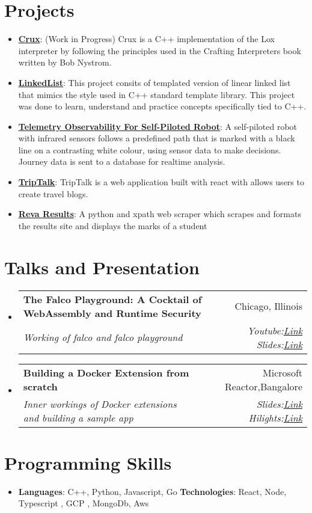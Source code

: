 \documentclass[letterpaper,11pt]{article}
\makeatletter
\newcommand{\resumeItem}[2]{
  \item\small{
    \textbf{#1}{: #2 \vspace{-2pt}}
  }
}
\newcommand{\resumeSubheading}[4]{
  \vspace{-1pt}\item
    \begin{tabular*}{0.97\textwidth}{l@{\extracolsep{\fill}}r}
      \textbf{#1} & #2 \\
      \textit{\small#3} & \textit{\small #4} \\
    \end{tabular*}\vspace{-5pt}
}
\newcommand{\resumeSubItem}[2]{\resumeItem{#1}{#2}\vspace{-4pt}}
\newcommand{\resumeSubHeadingListStart}{\begin{itemize}[leftmargin=*]}
\newcommand{\resumeSubHeadingListEnd}{\end{itemize}}
\makeatother
\begin{document}
\section{Projects}
  \resumeSubHeadingListStart
    \resumeSubItem{\href{https://github.com/Rohith-Raju/Crux}{Crux}}{(Work in Progress) Crux is a C++ implementation of the Lox interpreter by following the principles used in the Crafting Interpreters book written by Bob Nystrom.
    }
    \resumeSubItem{\href{https://github.com/Rohith-Raju/LinkedList}{LinkedList}}{This project consits of templated version of linear linked list that mimics the style used in C++ standard template library. This project was done to learn, 
    understand and practice concepts specifically tied to C++.}
    \resumeSubItem{\href{https://www.jetir.org/view?paper=JETIR2306084}{Telemetry Observability For Self-Piloted Robot}}
    {A self-piloted robot with infrared sensors follows a  predefined path that is marked with a 
    black line on a contrasting white colour, using sensor data to make decisions. Journey data is sent to a database for
    realtime analysis.}
    \resumeSubItem{\href{https://triptalk-production.web.app/home}{TripTalk}}
    {TripTalk is a  web application built with react with allows users to create travel blogs.}
    \resumeSubItem{\href{https://github.com/rohith-raju/Reva-results}{Reva Results}}
    {A python and xpath web scraper which scrapes and formats the results site and displays the marks of a student}
  \resumeSubHeadingListEnd

  \section{Talks and Presentation}
  \resumeSubHeadingListStart
    \resumeSubheading
      {The Falco Playground: A Cocktail of WebAssembly and Runtime Security}{ Chicago, Illinois}
      { Working of falco and falco playground } {Youtube:\href{https://youtu.be/imvDmhLRFRo?feature=shared}{Link} {Slides:\href{https://docs.google.com/presentation/d/17sfxAgLnr4ehiXhuEd9y9gcrihwq1bPD6al1aj0ZKao/edit?usp=sharing}{Link}}}
    \resumeSubheading
      {Building a Docker Extension from scratch }{ Microsoft Reactor,Bangalore}
      {Inner workings of Docker extensions and building a sample app}{Slides:\href{https://docs.google.com/presentation/d/1eOYVtNRt8SeyemGuL_uZIlJyrxOAl_gprnx9v2aZAUM/edit?usp=sharing}{Link}   Hilights:\href{https://drive.google.com/drive/folders/1Cc1-D9oDcjYr8iZqH8Dr1RG95xvYg9NM?usp=sharing}{Link}}
  \resumeSubHeadingListEnd

\section{Programming Skills}
 \resumeSubHeadingListStart
   \item{
     \textbf{Languages}{: C++, Python, Javascript, Go }
     \hfill
     \textbf{Technologies}{: React, Node, Typescript , GCP , MongoDb, Aws}
   }
 \resumeSubHeadingListEnd


\end{document}

